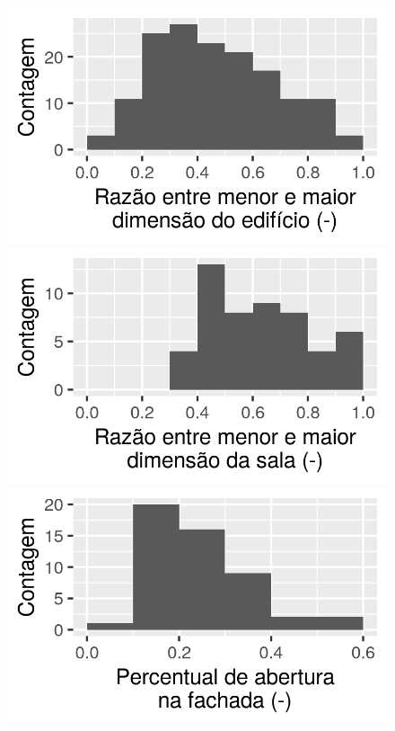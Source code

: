 \documentclass[brazil,hardcopy,openany]{ufscthesis} %
\begin{document}
\begin{figure}[H]
\begin{minipage}{.33\textwidth}
	\end{minipage}
	\centering
	\begin{minipage}{.33\textwidth}
		\centering
		\includegraphics[width=\linewidth]{img/hist_ratio_edificio.png}
	\end{minipage}%
	\begin{minipage}{.33\textwidth}
		\centering
		\includegraphics[width=\linewidth]{img/hist_ratio_sala.png}
	\end{minipage}%
	\begin{minipage}{.33\textwidth}
		\centering
		\includegraphics[width=\linewidth]{img/hist_PAF.png}

\end{minipage}
\end{figure}
\end{document}
